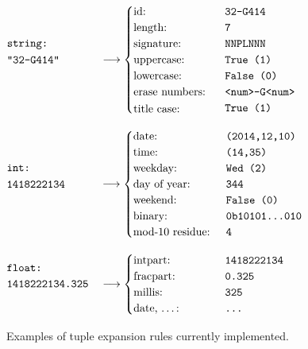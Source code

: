 \begin{figure}
  \newenvironment{stackedlines}{\renewcommand{\arraystretch}{1.2}\begin{array}[b]{@{}l@{\quad}l@{}}}{\end{array}}
  $\begin{stackedlines}
    \texttt{string:}\\
    \texttt{\parbox{\widthof{1418222134.325}}{"32-G414"}}
  \end{stackedlines} \longrightarrow
  \begin{cases}
    \text{id: } & \texttt{32-G414}\\
    \text{length: } & \texttt{7}\\
    \text{signature: } & \texttt{NNPLNNN}\\
    \text{uppercase: } & \texttt{True (1)}\\
    \text{lowercase: } & \texttt{False (0)}\\
    \text{erase numbers: } & \texttt{<num>-G<num>}\\
    \text{\parbox{\widthof{base-10 residue:}}{title case:} } & \texttt{True (1)}
  \end{cases}$

  $\begin{stackedlines}
    \texttt{int:}\\
    \texttt{\parbox{\widthof{1418222134.325}}{1418222134}}
  \end{stackedlines} \longrightarrow
  \begin{cases}
    \text{date: } & \texttt{(2014,12,10)}\\
    \text{time: } & \texttt{(14,35)}\\
    \text{weekday: } & \texttt{Wed (2)}\\
    \text{day of year: } & \texttt{344}\\
    \text{weekend: } & \texttt{False (0)}\\
    \text{binary: } & \texttt{0b10101\ldots010}\\
    \text{mod-10 residue: } & \texttt{4}
  \end{cases}$

   $\begin{stackedlines}
    \texttt{float:}\\
    \texttt{1418222134.325}
  \end{stackedlines} \longrightarrow
  \begin{cases}
    \text{intpart: } & \texttt{1418222134}\\
    \text{fracpart: } & \texttt{0.325}\\
    \text{millis: } & \texttt{325}\\
    \text{\parbox{\widthof{base-10 residue:}}{date, \ldots:} } & \texttt{\ldots}
  \end{cases}$

  \caption{Examples of tuple expansion rules currently implemented.}
  \label{fig:tuple-expansion}
\end{figure}